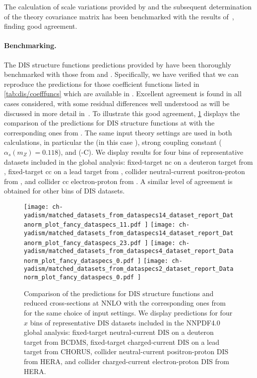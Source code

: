 The calculation of scale variations provided by \yadism and the subsequent
determination of the \mhou theory covariance matrix has been benchmarked with
the results of~\cite{NNPDF:2019ubu}, finding good agreement.

\paragraph{Benchmarking.}
%
The DIS structure functions predictions provided by \yadism have been
thoroughly benchmarked with those from \apfel and \qcdnum.
%
Specifically, we have verified that we can reproduce the \apfel predictions for
those coefficient functions listed in \cref{tab:dis/coefffuncs} which are
available in \apfel.
%
Excellent agreement is found in all cases considered, with some residual
differences well understood as will be discussed in more detail
in~\cite{yadism}.
%
To illustrate this good agreement, \cref{fig:dis/benchmark-apfel-yadism}
displays the comparison of the \yadism predictions for DIS structure functions
at \nnlo with the corresponding ones from \apfel.
%
The same input theory settings are used in both calculations, in particular the
\pdfs (in this case  \nnlo), strong coupling constant
($\alpha_s(m_Z)=0.118$), and \gmvfns (\fonll-C).
%
We display results for four bins of representative \dis datasets included in
the  global analysis: fixed-target \acrlong{nc} \dis on a deuteron
target from \bcdms, fixed-target \acrlong{cc} \dis on a lead target from
\chorus, collider neutral-current positron-proton \dis from \hera, and collider
\acrlong{cc} electron-proton \dis from \hera.
%
A similar level of agreement is obtained for other bins of DIS datasets.

\begin{figure}[!t]
  \centering
  \texttt{[image: 
    ch-yadism/matched\_datasets\_from\_dataspecs14\_dataset\_report\_Datanorm\_plot\_fancy\_dataspecs\_11.pdf
  ]}
  \texttt{[image: 
    ch-yadism/matched\_datasets\_from\_dataspecs14\_dataset\_report\_Datanorm\_plot\_fancy\_dataspecs\_23.pdf
  ]}
  \texttt{[image: 
    ch-yadism/matched\_datasets\_from\_dataspecs4\_dataset\_report\_Datanorm\_plot\_fancy\_dataspecs\_0.pdf
  ]}
  \texttt{[image: 
    ch-yadism/matched\_datasets\_from\_dataspecs2\_dataset\_report\_Datanorm\_plot\_fancy\_dataspecs\_0.pdf
  ]}
  \caption{
    Comparison of the \yadism predictions for DIS structure
    functions and reduced cross-sections at NNLO with the corresponding ones
    from \apfel for the same choice of input settings.
    We display  predictions for four $x$ bins of representative DIS datasets
    included in the NNPDF4.0 global analysis: fixed-target neutral-current DIS
    on a deuteron target from BCDMS, fixed-target charged-current DIS on a lead
    target from CHORUS, collider neutral-current positron-proton DIS from HERA,
    and collider charged-current electron-proton DIS from HERA.
  }    
  \label{fig:dis/benchmark-apfel-yadism}
\end{figure}
